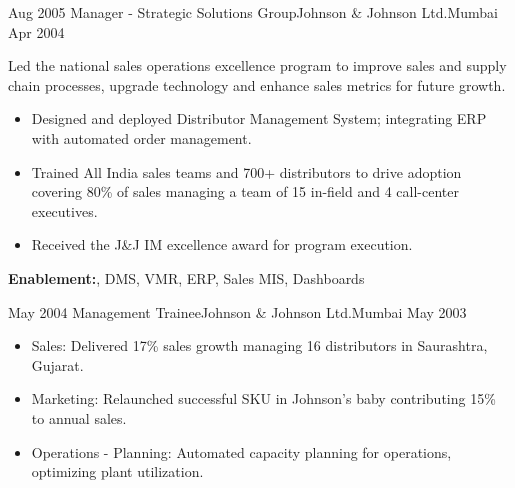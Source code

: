 \begin{experiences}
  \experience
  {Aug 2005}  {Manager - Strategic Solutions Group}{Johnson \& Johnson Ltd.}{Mumbai}
  {Apr 2004}   {
Led the national sales operations excellence program to improve sales and supply chain processes, upgrade technology and enhance sales metrics for future growth.
                      \begin{itemize}
        \item {Designed and deployed Distributor Management System; integrating ERP with automated order management.}
        \item {Trained All India sales teams and 700+ distributors to drive adoption covering 80\% of sales managing a team of 15 in-field and 4 call-center executives.}
        \item {Received the J\&J IM excellence award for program execution.}
                      \end{itemize}
                  }
        {\textbf{Enablement:}, DMS,  VMR, ERP,  Sales MIS, Dashboards}

  \experiencenotag
    {May 2004}  {Management Trainee}{Johnson \& Johnson Ltd.}{Mumbai}
  {May 2003}   {
                      \begin{itemize}
        \item {Sales: Delivered 17\% sales growth managing 16 distributors in Saurashtra, Gujarat.}
        \item {Marketing: Relaunched successful SKU in Johnson's baby contributing 15\% to annual sales.}
        \item {Operations - Planning: Automated capacity planning for operations, optimizing plant utilization.}
                              \end{itemize}
                  }
\end{experiences}
